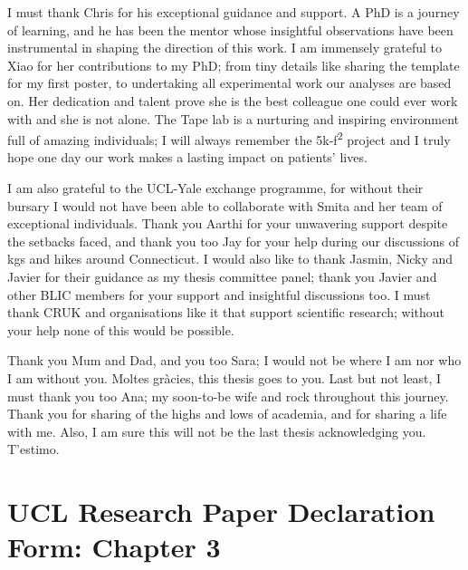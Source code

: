         
\begin{acknowledgements}

I must thank Chris for his exceptional guidance and support. A PhD is a journey of learning, and he has been the mentor whose insightful observations have been instrumental in shaping the direction of this work.
I am immensely grateful to Xiao for her contributions to my PhD; from tiny details like sharing the template for my first poster, to undertaking all experimental work our analyses are based on. Her dedication and talent prove she is the best colleague one could ever work with and she is not alone. The Tape lab is a nurturing and inspiring environment full of amazing individuals; I will always remember the 5k-f\textsuperscript{2} project and I truly hope one day our work makes a lasting impact on patients' lives. 

I am also grateful to the UCL-Yale exchange programme, for without their bursary I would not have been able to collaborate with Smita and her team of exceptional individuals. Thank you Aarthi for your unwavering support despite the setbacks faced, and thank you too Jay for your help during our discussions of \acrshort{kg}s and hikes around Connecticut. 
I would also like to thank Jasmin, Nicky and Javier for their guidance as my thesis committee panel; thank you Javier and other BLIC members for your support and insightful discussions too.
I must thank CRUK and organisations like it that support scientific research; without your help none of this would be possible.

Thank you Mum and Dad, and you too Sara; I would not be where I am nor who I am without you. Moltes gràcies, this thesis goes to you. Last but not least, I must thank you too Ana; my soon-to-be wife and rock throughout this journey. Thank you for sharing of the highs and lows of academia, and for sharing a life with me. Also, I am sure this will not be the last thesis acknowledging you. T'estimo.

\end{acknowledgements}


\newpage	
\section*{UCL Research Paper Declaration Form: Chapter 3}

